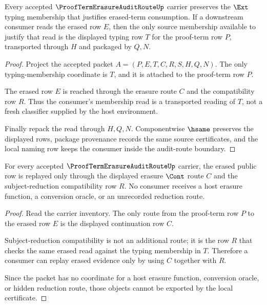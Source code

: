 \begin{theorem}
\label{thm:proofterm-erasure-audit-route-ext-membership-preservation}
Every accepted $\ProofTermErasureAuditRouteUp$ carrier preserves the $\Ext$ typing membership that justifies erased-term consumption. If a downstream consumer reads the erased row $E$, then the only source membership available to justify that read is the displayed typing row $T$ for the proof-term row $P$, transported through $H$ and packaged by $Q,N$.
\end{theorem}
\begin{proof}
Project the accepted packet $A=(P,E,T,C,R,S,H,Q,N)$. The only typing-membership coordinate is $T$, and it is attached to the proof-term row $P$.

The erased row $E$ is reached through the erasure route $C$ and the compatibility row $R$. Thus the consumer's membership read is a transported reading of $T$, not a fresh classifier supplied by the host environment.

Finally repack the read through $H,Q,N$. Componentwise $\hsame$ preserves the displayed rows, package provenance records the same source certificates, and the local naming row keeps the consumer inside the audit-route boundary.
\end{proof}

\begin{theorem}
\label{thm:proofterm-erasure-audit-route-erased-cont-replay}
For every accepted $\ProofTermErasureAuditRouteUp$ carrier, the erased public row is replayed only through the displayed erasure $\Cont$ route $C$ and the subject-reduction compatibility row $R$. No consumer receives a host erasure function, a conversion oracle, or an unrecorded reduction route.
\end{theorem}
\begin{proof}
Read the carrier inventory. The only route from the proof-term row $P$ to the erased row $E$ is the displayed continuation row $C$.

Subject-reduction compatibility is not an additional route; it is the row $R$ that checks the same erased read against the typing membership in $T$. Therefore a consumer can replay erased evidence only by using $C$ together with $R$.

Since the packet has no coordinate for a host erasure function, conversion oracle, or hidden reduction route, those objects cannot be exported by the local certificate.
\end{proof}

